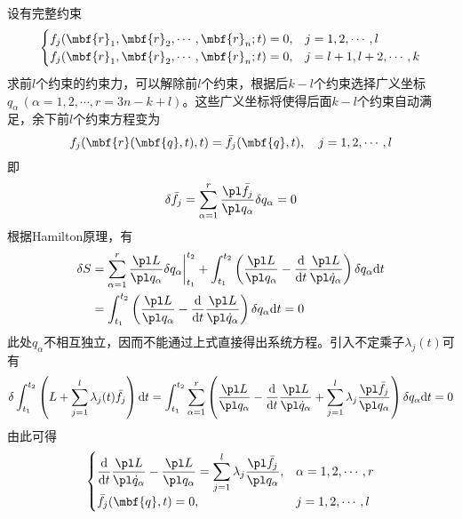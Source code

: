 设有完整约束
\begin{equation*}
	\begin{cases}
		f_j(\mbf{r}_1,\mbf{r}_2,\cdots,\mbf{r}_n;t) = 0, & j = 1,2,\cdots,l \\
		f_j(\mbf{r}_1,\mbf{r}_2,\cdots,\mbf{r}_n;t) = 0, & j = l+1,l+2,\cdots,k
	\end{cases}
\end{equation*}
求前$l$个约束的约束力，可以解除前$l$个约束，根据后$k-l$个约束选择广义坐标$q_\alpha\,(\alpha=1,2,\cdots,r = 3n-k+l)$。这些广义坐标将使得后面$k-l$个约束自动满足，余下前$l$个约束方程变为
\begin{equation*}
	f_j(\mbf{r}(\mbf{q},t),t) = \bar{f}_j(\mbf{q},t),\quad j=1,2,\cdots,l
\end{equation*}
即
\begin{equation*}
	\delta \bar{f}_j = \sum_{\alpha=1}^r \frac{\pl \bar{f}_j}{\pl q_\alpha} \delta q_\alpha = 0
\end{equation*}
根据Hamilton原理，有
\begin{align*}
	\delta S & = \sum_{\alpha=1}^r \frac{\pl L}{\pl q_\alpha} \delta q_\alpha\bigg|_{t_1}^{t_2} + \int_{t_1}^{t_2} \left(\frac{\pl L}{\pl q_\alpha} - \frac{\mathrm{d}}{\mathrm{d} t} \frac{\pl L}{\pl \dot{q}_\alpha} \right) \delta q_\alpha \mathrm{d} t \\
	& = \int_{t_1}^{t_2} \left(\frac{\pl L}{\pl q_\alpha} - \frac{\mathrm{d}}{\mathrm{d} t} \frac{\pl L}{\pl \dot{q}_\alpha} \right) \delta q_\alpha \mathrm{d} t = 0
\end{align*}
此处$q_\alpha$不相互独立，因而不能通过上式直接得出系统方程。引入不定乘子$\lambda_j(t)$可有
\begin{equation*}
	\delta \int_{t_1}^{t_2} \left(L+\sum_{j=1}^l \lambda_j(t) \bar{f}_j\right) \mathrm{d} t = \int_{t_1}^{t_2} \sum_{\alpha=1}^r \left(\frac{\pl L}{\pl q_\alpha} - \frac{\mathrm{d}}{\mathrm{d} t} \frac{\pl L}{\pl \dot{q}_\alpha} + \sum_{j=1}^l \lambda_j \frac{\pl \bar{f}_j}{\pl q_\alpha} \right) \delta q_\alpha \mathrm{d} t = 0
\end{equation*}
由此可得
\begin{equation}
	\begin{cases}
		\displaystyle \frac{\mathrm{d}}{\mathrm{d} t} \frac{\pl L}{\pl \dot{q}_\alpha} - \frac{\pl L}{\pl q_\alpha} = \sum_{j=1}^l \lambda_j \frac{\pl \bar{f}_j}{\pl q_\alpha},& \alpha=1,2,\cdots,r \\
		\bar{f}_j(\mbf{q},t) = 0, & j=1,2,\cdots,l
	\end{cases}
\end{equation}

